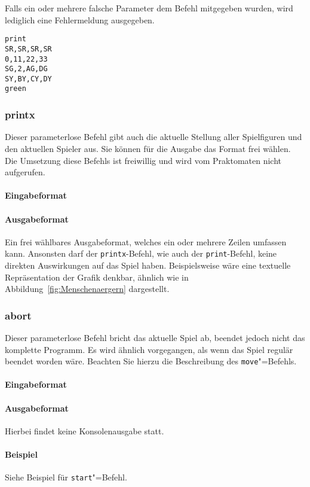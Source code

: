 Falls ein oder mehrere falsche Parameter dem Befehl mitgegeben wurden, wird lediglich eine Fehlermeldung ausgegeben.
\begin{tcolorbox}[title=Beispiel]
\begin{verbatim}
print
SR,SR,SR,SR
0,11,22,33
SG,2,AG,DG
SY,BY,CY,DY
green
\end{verbatim}
\end{tcolorbox}

\subsubsection*{printx}
Dieser parameterlose Befehl gibt auch die aktuelle Stellung aller Spielfiguren und den aktuellen Spieler aus. Sie können für die Ausgabe das Format frei wählen. Die Umsetzung diese Befehls ist freiwillig und wird vom Praktomaten nicht aufgerufen.
\paragraph{Eingabeformat}
\paragraph{Ausgabeformat}
Ein frei wählbares Ausgabeformat, welches ein oder mehrere Zeilen umfassen kann. Ansonsten darf der \texttt{printx}-Befehl, wie auch der \texttt{print}-Befehl, keine direkten Auswirkungen auf das Spiel haben. Beispielsweise wäre eine textuelle Repräsentation der Grafik denkbar, ähnlich wie in Abbildung~\ref{fig:Menschenaergern} dargestellt. 

\subsubsection*{abort}
Dieser parameterlose Befehl bricht das aktuelle Spiel ab, beendet jedoch nicht das komplette Programm. Es wird ähnlich vorgegangen, als wenn das Spiel regulär beendet worden wäre. Beachten Sie hierzu die Beschreibung des \texttt{move}"=Befehls.
\paragraph{Eingabeformat}
\paragraph{Ausgabeformat}
Hierbei findet keine Konsolenausgabe statt.
\paragraph{Beispiel}
Siehe Beispiel für \texttt{start}"=Befehl.


